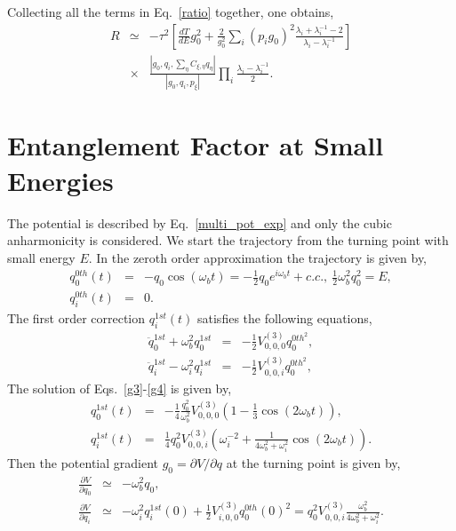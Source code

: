 \documentclass[journal=jpcafh,manuscript=article]{achemso}
\begin{document}
Collecting all the terms in Eq.~\ref{ratio} together, one obtains,
\begin{eqnarray}
  \label{c19}
  R&\simeq&-\tau^2\left[\frac{dT}{dE}g_0^2+\frac{2}{g_0^2}\sum_i (p_ig_0)^2
    \frac{\lambda_i+\lambda_i^{-1} -
      2}{\lambda_i-\lambda_i^{-1}}\right]
  \\
  \nonumber
  &\times&\frac{|g_0,q_i,\sum_{\eta}C_{\xi,\eta}q_{\eta}|}{|g_0,q_i,p_{\xi}|}\prod_i\frac{\lambda_i-\lambda_i^{-1}}{2}.
\end{eqnarray}

\setcounter{equation}{0}
\section{Entanglement Factor at Small Energies}

The potential is described by Eq.~\ref{multi_pot_exp} and only the
cubic anharmonicity is considered.  We start the trajectory from the
turning point with small energy $E$.  In the zeroth order
approximation the trajectory is given by,
\begin{eqnarray}
  \label{g2}
  q^{0th}_0(t)&=&-q_0\cos(\omega_bt)=-\frac{1}{2}q_0e^{i\omega_bt}+c.c.,\ \frac{1}{2}\omega_b^2q_0^2=E,
  \\
  \nonumber
  q^{0th}_i(t)&=&0.
\end{eqnarray}
The first order correction $q^{1st}_i(t)$ satisfies the following
equations,
\begin{eqnarray}
  \label{g3}
  \ddot{q}_0^{1st}+\omega_b^2q^{1st}_0&=&-\frac{1}{2}V_{0,0,0}^{(3)}q_0^{0th^2},
  \\
  \label{g4}
  \ddot{q}_i^{1st}-\omega_i^2q^{1st}_i&=&-\frac{1}{2}V_{0,0,i}^{(3)}q_0^{0th^2},  
\end{eqnarray}
The solution of Eqs.~\ref{g3}-\ref{g4} is given by,
\begin{eqnarray}
  \label{g5}
  q^{1st}_0(t)&=&-\frac{1}{4}\frac{q_0^2}{\omega_b^2}V_{0,0,0}^{(3)}(1-\frac{1}{3}\cos(2\omega_bt)),
  \\
  \label{g6}
  q^{1st}_i(t)&=&\frac{1}{4}q_0^2V_{0,0,i}^{(3)}(\omega_i^{-2}+\frac{1}{4\omega_b^2+\omega_i^2}\cos(2\omega_bt)).
\end{eqnarray}
Then the potential gradient $g_0=\partial V/\partial q$ at the
turning point is given by,
\begin{eqnarray}
  \label{g7}
  \frac{\partial V}{\partial q_0}&\simeq&-\omega_b^2q_0,
  \\
  \label{g8}
  \frac{\partial{V}}{\partial{q}_i}&\simeq&-\omega_i^2q_i^{1st}(0)+\frac{1}{2}V^{(3)}_{i,0,0}q_0^{0th}(0)^2
                                          =q_0^2V_{0,0,i}^{(3)}\frac{\omega_b^2}{4\omega_b^2+\omega_i^2}.                                 
\end{eqnarray}
\end{document}
